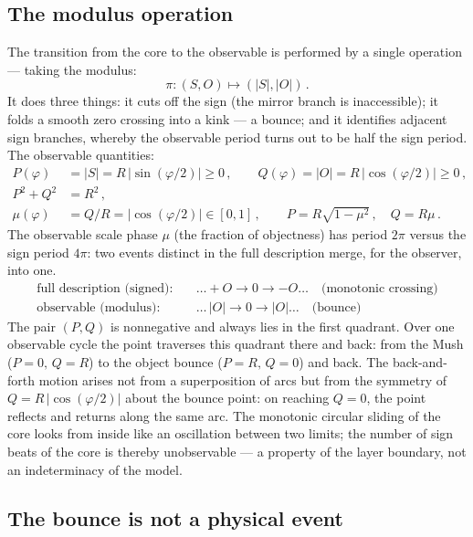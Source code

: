 \documentclass{article}
\begin{document}
\subsection{The modulus operation}

The transition from the core to the observable is performed by a single operation --- taking the modulus:
\begin{equation}
\pi : (S, O) \mapsto (|S|, |O|)\,.
\end{equation}
It does three things: it cuts off the sign (the mirror branch is inaccessible); it folds a smooth zero crossing into a kink --- a bounce; and it identifies adjacent sign branches, whereby the observable period turns out to be half the sign period. The observable quantities:
\begin{align}
P(\varphi) &= |S| = R\,|\sin(\varphi/2)| \geq 0\,, \qquad Q(\varphi) = |O| = R\,|\cos(\varphi/2)| \geq 0\,, \\
P^2 + Q^2 &= R^2\,, \\
\mu(\varphi) &= Q/R = |\cos(\varphi/2)| \in [0, 1]\,, \qquad P = R\sqrt{1 - \mu^2}\,, \quad Q = R\mu\,.
\end{align}
The observable scale phase $\mu$ (the fraction of objectness) has period $2\pi$ versus the sign period $4\pi$: two events distinct in the full description merge, for the observer, into one.
\begin{align*}
\text{full description (signed):} &\quad \ldots +O \to 0 \to -O \ldots \quad \text{(monotonic crossing)} \\
\text{observable (modulus):} &\quad \ldots\, |O| \to 0 \to |O| \ldots \quad \text{(bounce)}
\end{align*}
The pair $(P, Q)$ is nonnegative and always lies in the first quadrant. Over one observable cycle the point traverses this quadrant there and back: from the Mush ($P = 0,\, Q = R$) to the object bounce ($P = R,\, Q = 0$) and back. The back-and-forth motion arises not from a superposition of arcs but from the symmetry of $Q = R\,|\cos(\varphi/2)|$ about the bounce point: on reaching $Q = 0$, the point reflects and returns along the same arc. The monotonic circular sliding of the core looks from inside like an oscillation between two limits; the number of sign beats of the core is thereby unobservable --- a property of the layer boundary, not an indeterminacy of the model.

\subsection{The bounce is not a physical event}
\end{document}

